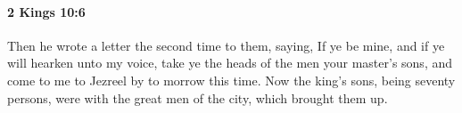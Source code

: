 
		\paragraph{2 Kings 10:6} %
			\label{2KINGS-10-6}

			Then he wrote a letter the second time to them, saying, If ye be mine, and if ye will hearken unto my voice, take ye the heads of the men your master’s sons, and come to me to Jezreel by to morrow this time. Now the king’s sons, being seventy persons, were with the great men of the city, which brought them up.


